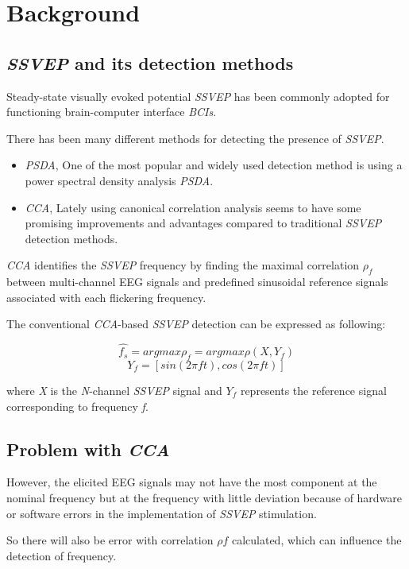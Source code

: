 \documentclass{article}
\begin{document}
\section{Background}

\subsection{\emph{SSVEP} and its detection methods}

Steady-state visually evoked potential \emph{SSVEP} has been commonly adopted for functioning brain-computer interface \emph{BCIs}.

There has been many different methods for detecting the presence of \emph{SSVEP}.

\begin{itemize}
  \item \emph{PSDA}, One of the most popular and widely used detection method is using a power spectral density analysis \emph{PSDA}.

  \item \emph{CCA}, Lately using canonical correlation analysis seems to have some promising improvements and advantages compared to traditional \emph{SSVEP} detection methods.
\end{itemize}

\emph{CCA} identifies the \emph{SSVEP} frequency by finding the maximal correlation $\rho_{f}$ between multi-channel EEG signals and predefined sinusoidal reference signals associated with each flickering frequency.

The conventional \emph{CCA}-based \emph{SSVEP} detection can be expressed as following:

$$\hat{f_s} = arg max \rho_{f} = arg max \rho(X, Y_{f})$$
$$Y_{f} = [sin(2\pi ft), cos(2\pi ft)]$$

where \emph{X} is the \emph{N}-channel \emph{SSVEP} signal and $Y_{f}$ represents the reference signal corresponding to frequency \emph{f}.

\subsection{Problem with \emph{CCA}}

However, the elicited EEG signals may not have the most component at the nominal frequency but at the frequency with little deviation because of hardware or software errors in the implementation of \emph{SSVEP} stimulation.

So there will also be error with correlation $\rho{f}$ calculated, which can influence the detection of frequency.
\end{document}
